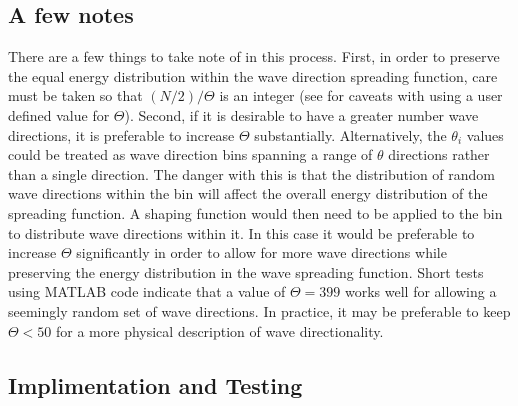 \subsection{A few notes}
There are a few things to take note of in this process.  First, in order to preserve the equal energy distribution within the wave direction spreading function, care must be taken so that $(N/2)/\Theta$ is an integer (see  for caveats with using a user defined value for $\Theta$).  Second, if it is desirable to have a greater number wave directions, it is preferable to increase $\Theta$ substantially.  Alternatively, the $\theta_i$ values could be treated as wave direction bins spanning a range of $\theta$ directions rather than a single direction.  The danger with this is that the distribution of random wave directions within the bin will affect the overall energy distribution of the spreading function.  A shaping function would then need to be applied to the bin to distribute wave directions within it.  In this case it would be preferable to increase $\Theta$ significantly in order to allow for more wave directions while preserving the energy distribution in the wave spreading function.  Short tests using MATLAB code indicate that a value of $\Theta = 399$ works well for allowing a seemingly random set of wave directions.  In practice, it may be preferable to keep $\Theta < 50$ for a more physical description of wave directionality.


\subsection{Implimentation and Testing}
\label{sec:MultiDir:Testing}

